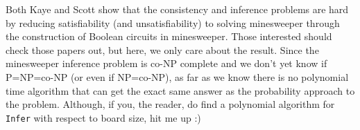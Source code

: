 Both Kaye and Scott show that the consistency and inference problems are hard by reducing satisfiability (and unsatisfiability) to solving minesweeper through the construction of Boolean circuits in minesweeper. Those interested should check those papers out, but here, we only care about the result. Since the minesweeper inference problem is co-NP complete and we don't yet know if P=NP=co-NP (or even if NP=co-NP), as far as we know there is no polynomial time algorithm that can get the exact same answer as the probability approach to the problem. Although, if you, the reader, do find a polynomial algorithm for \texttt{Infer} with respect to board size, hit me up :)\\